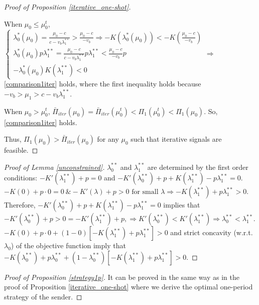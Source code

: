 \documentclass[11pt]{extarticle}
\newcommand{\ra}{\Rightarrow}
\begin{document}
\begin{proof}[Proof of Proposition \ref{iterative_one-shot}]
\begin{enumerate}[i)]
		When $\mu_0 \leq \mu_0^t$, $\begin{cases}
		\lambda_0^*(\mu_0) = \frac{\mu_0-c}{c-v_b\lambda_1^{**}} > \frac{\mu_0-c}{-v_b} \ra -K(\lambda_0^*(\mu_0)) < -K(\frac{\mu_0-c}{-v_b})\\
		\lambda_0^*(\mu_0) p \lambda_1^{**} = \frac{\mu_0-c}{c-v_b\lambda_1^{**}} p \lambda_1^{**} < \frac{\mu_0 - c}{-v_b}p\\
		-\lambda_0^*(\mu_0) K(\lambda_1^{**}) < 0
		\end{cases} \ra$ \eqref{comparison1iter} holds, where the first inequality holds because $-v_b > \mu_1 > c - v_b \lambda_1^{**}$.
		
		When $\mu_0 > \mu_0^t$, 	  $\bar{\Pi}_{iter}(\mu_0) = \bar{\Pi}_{iter}(\mu_0^t)
		< \Pi_1(\mu_0^t)
		< \Pi_1(\mu_0)$. So, \eqref{comparison1iter} holds.		
	\end{enumerate}
	Thus, $\Pi_1(\mu_0) > \bar{\Pi}_{iter}(\mu_0)$ for any $\mu_0$ such that iterative signals are feasible.	
\end{proof}


\begin{proof}[Proof of Lemma \ref{unconstrained}]
	$\lambda_0^{**}$ and $\lambda_1^{**}$ are determined by the first order conditions: $-K'(\lambda_1^{**}) + p = 0$ and $-K'(\lambda_0^{**}) + p + K(\lambda_1^{**}) - p \lambda_1^{**} = 0$.  $- K(0) + p \cdot 0 = 0~ \& -K'(\lambda) + p > 0 \text{ for small } \lambda \Rightarrow - K(\lambda_1^{**}) + p \lambda_1^{**} > 0$. Therefore, $-K'(\lambda_0^{**}) + p + K(\lambda_1^{**}) - p \lambda_1^{**} = 0$ implies that $-K'(\lambda_0^{**}) + p > 0 = -K'(\lambda_1^{**}) + p, \Rightarrow K'(\lambda_0^{**}) < K'(\lambda_1^{**}) \Rightarrow \lambda_0^{**} < \lambda_1^{**}$. $-K(0) + p\cdot 0 + (1-0) \left[-K(\lambda_1^{**})+p \lambda_1^{**}\right] > 0$ and strict concavity (w.r.t. $\lambda_0$) of the objective function imply that $-K(\lambda_0^{**}) + p \lambda_0^{**} + (1-\lambda_0^{**}) \left[-K(\lambda_1^{**})+p \lambda_1^{**}\right]  > 0$.
\end{proof}



\begin{proof}[Proof of Proposition \ref{strategy1p}]
	It can be proved in the same way as in the proof of Proposition \ref{iterative_one-shot} where we derive the optimal one-period strategy of the sender.
\end{proof}
\end{document}

